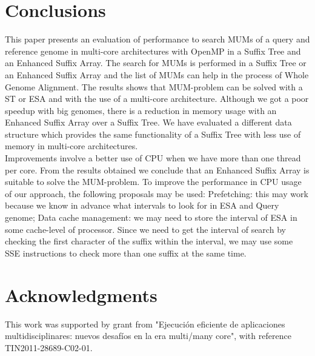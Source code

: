 \documentclass{acm_proc_article-sp}
\begin{document}
\section{Conclusions}
This paper presents an evaluation of performance to search MUMs of a query and reference genome in multi-core architectures with OpenMP in a Suffix Tree and an Enhanced Suffix Array. The search for MUMs is performed in a Suffix Tree or an Enhanced Suffix Array and the list of MUMs can help in the process of Whole Genome Alignment. The results shows that MUM-problem can be solved with a ST or ESA and with the use of a multi-core architecture. Although we got a poor speedup with big genomes, there is a reduction in memory usage with an Enhanced Suffix Array over a Suffix Tree. We have evaluated a different data structure which provides the same functionality of a Suffix Tree with less use of memory in multi-core architectures.\\
Improvements involve a better use of CPU when we have more than one thread per core. From the results obtained we conclude that an Enhanced Suffix Array is suitable to solve the MUM-problem. To improve the performance in CPU usage of our approach, the following proposals may be used: Prefetching: this may work because we know in advance what intervals to look for in ESA and Query genome; Data cache management: we may need to store the interval of ESA in some cache-level of processor. Since we need to get the interval of search by checking the first character of the suffix within the interval, we may use some SSE instructions to check more than one suffix at the same time.

\section{Acknowledgments}
This work was supported by grant from "Ejecuci\'on eficiente de aplicaciones multidisciplinares: nuevos desaf\'ios en la era multi/many core", with reference TIN2011-28689-C02-01.
%

%
%
\balancecolumns
\end{document}
